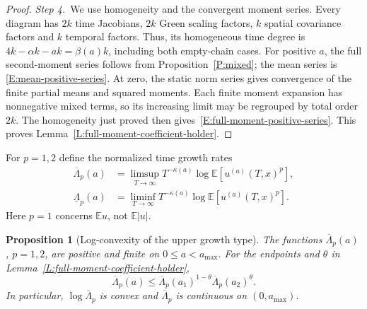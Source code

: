 \documentclass[12pt,oneside,openany]{book}
\makeatletter
\let\lean@pending\@empty
\newcommand{\LeanMarker}[1]{\gdef\lean@pending{#1}}
\numberwithin{equation}{section}
\newtheorem{proposition}[theorem]{Proposition}
\theoremstyle{nogostyle}
\theoremstyle{definition}
\newcommand{\E}{\mathbb{E}}
\makeatother
\begin{document}
\begin{proof}
  \medskip
  \noindent\textit{Step 4.~}We use homogeneity and the convergent moment
  series.
  Every diagram has \(2k\) time Jacobians, \(2k\) Green scaling factors, \(k\)
  spatial covariance factors and \(k\) temporal factors. Thus, its homogeneous
  time degree is \(4k-\alpha k-ak=\beta(a)k\), including both empty-chain cases.
  For positive \(a\), the full second-moment series follows from
  Proposition~\ref{P:mixed}; the mean series is \eqref{E:mean-positive-series}.
  At zero, the static norm series gives convergence of the finite partial means
  and squared moments. Each finite moment expansion has nonnegative mixed terms,
  so its increasing limit may be regrouped by total order \(2k\). The
  homogeneity just proved then gives~\eqref{E:full-moment-positive-series}. This
  proves Lemma~\ref{L:full-moment-coefficient-holder}.
\end{proof}

For \(p=1,2\) define the normalized time growth rates
\begin{equation}\label{E:moment-growth-types}
  \begin{split}
    \overline{\Lambda}_p(a)&=\limsup_{T\to\infty}
    T^{-\kappa(a)}\log\E[u^{(a)}(T,x)^p],\\
    \underline{\Lambda}_p(a)&=\liminf_{T\to\infty}
    T^{-\kappa(a)}\log\E[u^{(a)}(T,x)^p].
  \end{split}
\end{equation}
Here \(p=1\) concerns \(\E u\), not \(\E|u|\).

\LeanMarker{P:moment-growth-logconvex}
\begin{proposition}[Log-convexity of the upper growth type]
  \label{P:moment-growth-logconvex}
  The functions \(\overline{\Lambda}_p(a)\), \(p=1,2\), are positive and finite
  on \(0\le a<a_{\max}\). For the endpoints and \(\theta\) in
  Lemma~\ref{L:full-moment-coefficient-holder},
  \begin{equation}\label{E:moment-growth-logconvex}
    \overline{\Lambda}_p(a)\le
    \overline{\Lambda}_p(a_1)^{1-\theta}
    \overline{\Lambda}_p(a_2)^\theta .
  \end{equation}
  In particular, \(\log\overline{\Lambda}_p\) is convex and
  \(\overline{\Lambda}_p\) is continuous on \((0,a_{\max})\).
\end{proposition}
\end{document}
